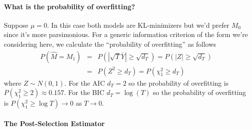 
\paragraph{What is the probability of overfitting?} Suppose $\mu = 0$. In this case both models are KL-minimizers but we'd prefer $M_0$ since it's more parsimonious. For a generic information criterion of the form we're considering here, we calculate the ``probability of overfitting'' as follows
\begin{eqnarray*}
	P\left(\widehat{M} = M_1\right) &=& P\left(|\sqrt{T}\bar{Y}|\geq \sqrt{d_T}\right) = P(|Z|\geq \sqrt{d_T})\\
	 &=& P(Z^2 \geq d_T) = P(\chi^2_1 \geq d_T)
\end{eqnarray*}
where $Z \sim N(0,1)$. For the AIC $d_T = 2$ so the probability of overfitting is $P(\chi^2_1 \geq 2)\approx 0.157$. For the BIC $d_T = \log(T)$ so the probability of overfitting is $P(\chi^2_1 \geq \log T) \rightarrow 0$ as $T\rightarrow 0$.

\paragraph{The Post-Selection Estimator}


